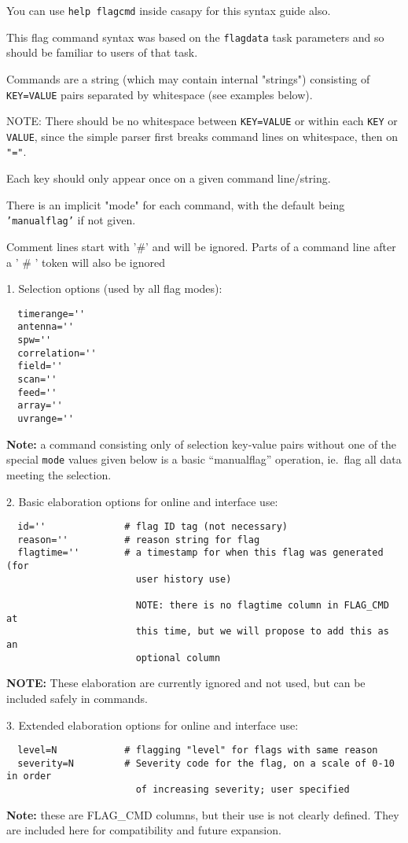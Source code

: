 You can use {\tt help flagcmd} inside casapy for this syntax guide also.

This flag command syntax was based on the {\tt flagdata} task
parameters and so should be familiar to users of that task.

Commands are a string (which may contain internal "strings") consisting of
{\tt KEY=VALUE} pairs separated by whitespace (see examples below). 

NOTE: There should be no whitespace between {\tt KEY=VALUE} or within
each {\tt KEY} or {\tt VALUE}, since the simple parser first breaks
command lines on whitespace, then on {\tt "="}.

Each key should only appear once on a given command line/string.

There is an implicit "mode" for each command, with the default
being {\tt 'manualflag'} if not given.

Comment lines start with '\#' and will be ignored. 
Parts of a command line after a ' \# ' token will also be ignored

1. Selection options (used by all flag modes):
\begin{verbatim}
  timerange=''
  antenna=''
  spw=''
  correlation=''
  field=''
  scan=''
  feed=''
  array=''
  uvrange=''
\end{verbatim}
{\bf Note:} a command consisting only of selection key-value pairs
without one of the special {\tt mode} values given below is a 
basic ``manualflag'' operation, 
ie.\ flag all data meeting the selection.

2. Basic elaboration options for online and interface use:
\begin{verbatim}
  id=''              # flag ID tag (not necessary)
  reason=''          # reason string for flag
  flagtime=''        # a timestamp for when this flag was generated (for 
                       user history use)

                       NOTE: there is no flagtime column in FLAG_CMD at
                       this time, but we will propose to add this as an
                       optional column
\end{verbatim}
{\bf NOTE:} These elaboration are currently ignored and not used, but
can be included safely in commands.

3. Extended elaboration options for online and interface use:
\begin{verbatim}
  level=N            # flagging "level" for flags with same reason
  severity=N         # Severity code for the flag, on a scale of 0-10 in order 
                       of increasing severity; user specified
\end{verbatim}
{\bf Note:} these are FLAG\_CMD columns, but their use is not clearly
defined. They are included here for compatibility and future expansion.


